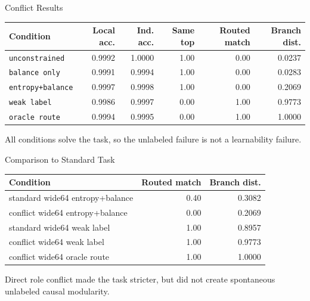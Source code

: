 \documentclass[aspectratio=169]{beamer}
\begin{document}
\begin{frame}{Conflict Results}
  \begin{center}
  \scriptsize
  \begin{tabular}{lrrrrr}
    \toprule
    Condition & Local acc. & Ind. acc. & Same top & Routed match & Branch dist. \\
    \midrule
    \texttt{unconstrained} & 0.9992 & 1.0000 & 1.00 & 0.00 & 0.0237 \\
    \texttt{balance only} & 0.9991 & 0.9994 & 1.00 & 0.00 & 0.0283 \\
    \texttt{entropy+balance} & 0.9997 & 0.9998 & 1.00 & 0.00 & 0.2069 \\
    \texttt{weak label} & 0.9986 & 0.9997 & 0.00 & 1.00 & 0.9773 \\
    \texttt{oracle route} & 0.9994 & 0.9995 & 0.00 & 1.00 & 1.0000 \\
    \bottomrule
  \end{tabular}
  \end{center}

  \vspace{0.5em}
  All conditions solve the task, so the unlabeled failure is not a learnability failure.
\end{frame}

\begin{frame}{Comparison to Standard Task}
  \begin{center}
  \scriptsize
  \begin{tabular}{lrr}
    \toprule
    Condition & Routed match & Branch dist. \\
    \midrule
    standard wide64 entropy+balance & 0.40 & 0.3082 \\
    conflict wide64 entropy+balance & 0.00 & 0.2069 \\
    standard wide64 weak label & 1.00 & 0.8957 \\
    conflict wide64 weak label & 1.00 & 0.9773 \\
    conflict wide64 oracle route & 1.00 & 1.0000 \\
    \bottomrule
  \end{tabular}
  \end{center}

  \vspace{0.7em}
  Direct role conflict made the task stricter, but did not create spontaneous
  unlabeled causal modularity.
\end{frame}
\end{document}

